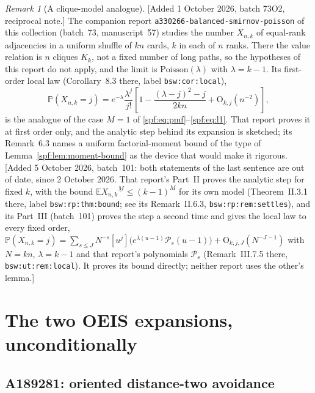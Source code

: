 \documentclass[11pt]{article}
\numberwithin{equation}{section}
\theoremstyle{definition}
\theoremstyle{remark}
\newtheorem{remark}[theorem]{Remark}
\theoremstyle{definition}
\newcommand{\E}{\mathbb E}
\newcommand{\Pp}{\mathbb P}
\newcommand{\fall}[2]{{#1}^{\underline{#2}}}
\newcommand{\bigO}{\mathrm O}
\begin{document}
\begin{remark}[A clique-model analogue]
\label{spf:rem:clique-analogue}
[Added 1 October 2026, batch 73O2, reciprocal note.] The companion report
\texttt{a330266-balanced-smirnov-poisson} of this collection (batch~73,
manuscript~57) studies the number $X_{n,k}$ of equal-rank adjacencies in a
uniform shuffle of $kn$ cards, $k$ in each of $n$ ranks. There the value
relation is $n$ cliques $K_k$, not a fixed number of long paths, so the
hypotheses of this report do not apply, and the limit is
$\mathrm{Poisson}(\lambda)$ with $\lambda=k-1$. Its first-order local law
(Corollary~8.3 there, label \texttt{bsw:cor:local}),
\begin{equation*}
 \Pp(X_{n,k}=j)=e^{-\lambda}\frac{\lambda^j}{j!}
 \left[1-\frac{(\lambda-j)^2-j}{2kn}+\bigO_{k,j}(n^{-2})\right],
\end{equation*}
is the analogue of the case $M=1$ of \eqref{spf:eq:pmf}--\eqref{spf:eq:l1}.
That report proves it at first order only, and the analytic step behind its
expansion is sketched; its Remark~6.3 names a uniform factorial-moment bound
of the type of Lemma~\ref{spf:lem:moment-bound} as the device that would make
it rigorous.
[Added 5 October 2026, batch~101: both statements of the last sentence are
out of date, since 2 October 2026. That report's Part~II proves the
analytic step for fixed $k$, with the bound $\E\fall{X_{n,k}}{M}\le(k-1)^M$
for its own model (Theorem~II.3.1 there, label \texttt{bsw:rp:thm:bound}; see
its Remark~II.6.3, \texttt{bsw:rp:rem:settles}), and its Part~III
(batch~101) proves the step a second time and gives the local law to every
fixed order,
$\Pp(X_{n,k}=j)=\sum_{s\le J}N^{-s}[u^j]\bigl(e^{\lambda(u-1)}\mathcal
P_s(u-1)\bigr)+\bigO_{k,j,J}(N^{-J-1})$ with $N=kn$, $\lambda=k-1$ and that
report's polynomials $\mathcal P_s$ (Remark~III.7.5 there,
\texttt{bsw:ut:rem:local}). It proves its bound directly; neither report
uses the other's lemma.]
\end{remark}

\section{The two OEIS expansions, unconditionally}
\label{spf:sec:OEIS-results}

\subsection{A189281: oriented distance-two avoidance}
\end{document}
